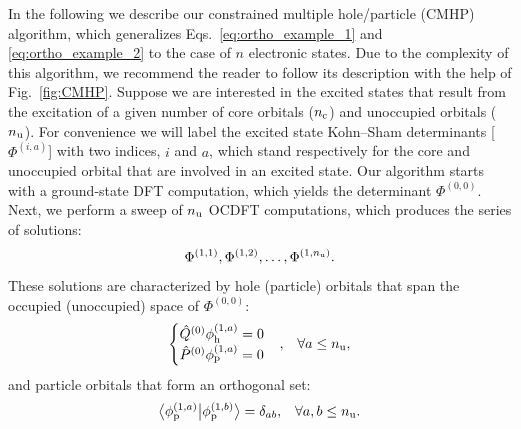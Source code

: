\documentclass[8.5pt,twoside,twocolumn]{article}
\newcommand{\braket}[3][0]
{\ifthenelse{\equal{#1}{0}}{\left\langle #2 \middle| #3 \right\rangle}
{\ifthenelse{\equal{#1}{1}}{\big\langle #2 \big| #3 \big\rangle}
{\ifthenelse{\equal{#1}{2}}{\Big\langle #2 \Big| #3 \Big\rangle}
{\ifthenelse{\equal{#1}{3}}{\bigg\langle #2 \bigg| #3 \bigg\rangle}
{\ifthenelse{\equal{#1}{4}}{\Bigg\langle #2 \Bigg| #3 \Bigg\rangle}
{Error}}}}}
}
\begin{document}
In the following we describe our constrained multiple hole/particle (CMHP) algorithm, which generalizes Eqs.~\eqref{eq:ortho_example_1} and \eqref{eq:ortho_example_2} to the case of $n$ electronic states.  Due to the complexity of this algorithm, we recommend the reader to follow its description with the help of Fig.~\ref{fig:CMHP}.
Suppose we are interested in the excited states that result from the excitation of a given number of core orbitals ($n_{\rm c}$) and unoccupied orbitals ($n_{\rm u}$).
For convenience we will label the excited state Kohn--Sham determinants [$\Phi^{(i,a)}$] with two indices, $i$ and $a$, which stand respectively for the core and unoccupied orbital that are involved in an excited state.
Our algorithm starts with a ground-state DFT computation, which yields the determinant $\Phi^{(0,0)}$.
Next, we perform a sweep of $n_{\rm u}$ OCDFT computations, which produces the series of solutions:
\begin{equation}
\Phi^{(1,1)}, \Phi^{(1,2)}, \ldots, \Phi^{(1,n_{\rm u})}.
\end{equation}
These solutions are characterized by hole (particle) orbitals that span the occupied (unoccupied) space of $\Phi^{(0,0)}$:
\begin{align}
\begin{cases}
\hat{Q}^{(0)}\phi_{\rm h}^{(1,a)}= 0\\
\hat{P}^{(0)}\phi_{\rm p}^{(1,a)}= 0
\end{cases} &,&\forall a \leq n_{\rm u},
\end{align}
and particle orbitals that form an orthogonal set:
\begin{align}
\braket[1]{\phi^{(1,a)}_{\rm p}}{\phi^{(1,b)}_{\rm p}} &= \delta_{ab}, &\forall a,b \leq n_{\rm u}.
\end{align}
\end{document}
